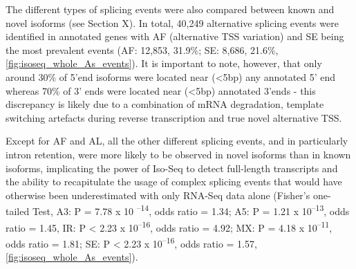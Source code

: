 The different types of splicing events were also compared between known and novel isoforms (see Section X). In total, 40,249 alternative splicing events were identified in annotated genes with AF (alternative TSS variation) and SE being the most prevalent events (AF: 12,853, 31.9\%; SE: 8,686, 21.6\%, \cref{fig:isoseq_whole_As_events}). It is important to note, however, that only around 30\% of 5'end isoforms were located near (<5bp) any annotated 5' end whereas 70\% of 3' ends were located near (<5bp) annotated 3'ends - this discrepancy is likely due to a combination of mRNA degradation, template switching artefacts during reverse transcription and true novel alternative TSS. 

Except for AF and AL, all the other different splicing events, and in particularly intron retention, were more likely to be observed in novel isoforms than in known isoforms, implicating the power of Iso-Seq to detect full-length transcripts and the ability to recapitulate the usage of complex splicing events that would have otherwise been underestimated with only RNA-Seq data alone (Fisher's one-tailed Test, A3: P = 7.78 x 10 \textsuperscript{–14}, odds ratio = 1.34; A5: P = 1.21 x 10\textsuperscript{–13}, odds ratio = 1.45, IR: P < 2.23 x 10\textsuperscript{–16}, odds ratio = 4.92; MX: P = 4.18 x 10\textsuperscript{–11}, odds ratio = 1.81; SE: P < 2.23 x 10\textsuperscript{–16}, odds ratio = 1.57, \cref{fig:isoseq_whole_As_events}). 

